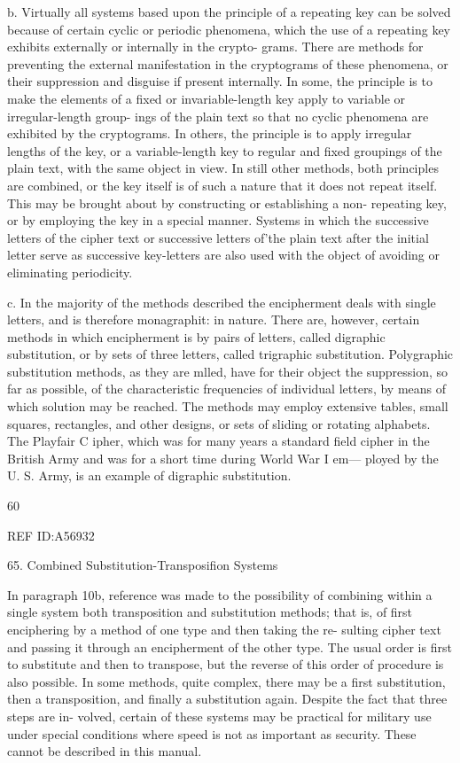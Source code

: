 {b. Virtually all systems based upon the principle of a repeating key
can be solved because of certain cyclic or periodic phenomena, which the
use of a repeating key exhibits externally or internally in the crypto-
grams. There are methods for preventing the external manifestation in
the cryptograms of these phenomena, or their suppression and disguise
if present internally. In some, the principle is to make the elements of a
ﬁxed or invariable-length key apply to variable or irregular-length group-
ings of the plain text so that no cyclic phenomena are exhibited by the
cryptograms. In others, the principle is to apply irregular lengths of the
key, or a variable-length key to regular and ﬁxed groupings of the plain
text, with the same object in view. In still other methods, both principles
are combined, or the key itself is of such a nature that it does not repeat
itself. This may be brought about by constructing or establishing a non-
repeating key, or by employing the key in a special manner. Systems in
which the successive letters of the cipher text or successive letters of'the
plain text after the initial letter serve as successive key-letters are also
used with the object of avoiding or eliminating periodicity.

c. In the majority of the methods described the encipherment deals
with single letters, and is therefore monagraphit: in nature. There are,
however, certain methods in which encipherment is by pairs of letters,
called digraphic substitution, or by sets of three letters, called trigraphic
substitution. Polygraphic substitution methods, as they are mlled, have
for their object the suppression, so far as possible, of the characteristic
frequencies of individual letters, by means of which solution may be
reached. The methods may employ extensive tables, small squares,
rectangles, and other designs, or sets of sliding or rotating alphabets.
The Playfair C ipher, which was for many years a standard ﬁeld cipher in
the British Army and was for a short time during World War I em—
ployed by the U. S. Army, is an example of digraphic substitution.

60

 

 

REF ID:A56932

65. Combined Substitution-Transposifion Systems

In paragraph 10b, reference was made to the possibility of combining
within a single system both transposition and substitution methods; that
is, of ﬁrst enciphering by a method of one type and then taking the re-
sulting cipher text and passing it through an encipherment of the other
type. The usual order is ﬁrst to substitute and then to transpose, but
the reverse of this order of procedure is also possible. In some methods,
quite complex, there may be a ﬁrst substitution, then a transposition, and
ﬁnally a substitution again. Despite the fact that three steps are in-
volved, certain of these systems may be practical for military use under
special conditions where speed is not as important as security. These
cannot be described in this manual.

}
